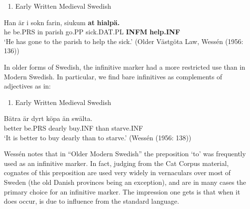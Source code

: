 \begin{enumerate} %
\item 
Early Written Medieval Swedish

\end{enumerate} %
\ea\label{}
\gll Han  är  i  sokn  farin,  siukum  \textbf{at} \textbf{hialpä.}\\


he  be.PRS  in  parish  go.PP  sick.DAT.PL  \textbf{INFM} \textbf{help.INF}\\ %


‘He has gone to the parish to help the sick.’ (Older Västgöta Law, Wessén (1956: 136)) 
\z

In older forms of Swedish, the infinitive marker had a more restricted use than in Modern Swedish. In particular, we find bare infinitives as complements of adjectives as in:

\begin{enumerate} %
\item 
Early Written Medieval Swedish

\end{enumerate} %
\ea\label{}
\gll Bätra  är  dyrt  köpa  än  swälta.  \\


better  be.PRS  dearly  buy.INF  than  starve.INF  \\ %


‘It is better to buy dearly than to starve.’ (Wessén (1956: 138))
\z

Wessén notes that in “Older Modern Swedish” the preposition  ‘to’ was frequently used as an infinitive marker. In fact, judging from the Cat Corpus material, cognates of this preposition are used very widely in vernaculars over most of Sweden (the old Danish provinces being an exception), and are in many cases the primary choice for an infinitive marker. The impression one gets is that when it does occur, is due to influence from the standard language. 

